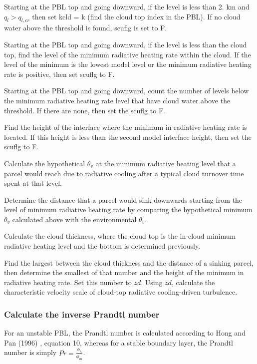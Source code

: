 \begin{DoxyItemize}
\item Starting at the P\+BL top and going downward, if the level is less than 2. km and $q_l>q_{l,cr}$ then set kcld = k (find the cloud top index in the P\+BL). If no cloud water above the threshold is found, scuflg is set to F.
\item Starting at the P\+BL top and going downward, if the level is less than the cloud top, find the level of the minimum radiative heating rate within the cloud. If the level of the minimum is the lowest model level or the minimum radiative heating rate is positive, then set scuflg to F.
\item Starting at the P\+BL top and going downward, count the number of levels below the minimum radiative heating rate level that have cloud water above the threshold. If there are none, then set the scuflg to F.
\item Find the height of the interface where the minimum in radiative heating rate is located. If this height is less than the second model interface height, then set the scuflg to F.
\item Calculate the hypothetical $\theta_v$ at the minimum radiative heating level that a parcel would reach due to radiative cooling after a typical cloud turnover time spent at that level.
\item Determine the distance that a parcel would sink downwards starting from the level of minimum radiative heating rate by comparing the hypothetical minimum $\theta_v$ calculated above with the environmental $\theta_v$.
\item Calculate the cloud thickness, where the cloud top is the in-\/cloud minimum radiative heating level and the bottom is determined previously.
\item Find the largest between the cloud thickness and the distance of a sinking parcel, then determine the smallest of that number and the height of the minimum in radiative heating rate. Set this number to $zd$. Using $zd$, calculate the characteristic velocity scale of cloud-\/top radiative cooling-\/driven turbulence.
\end{DoxyItemize}

\subsubsection*{Calculate the inverse Prandtl number}

For an unstable P\+BL, the Prandtl number is calculated according to Hong and Pan (1996) \cite{hong_and_pan_1996}, equation 10, whereas for a stable boundary layer, the Prandtl number is simply $Pr = \frac{\phi_h}{\phi_m}$.

